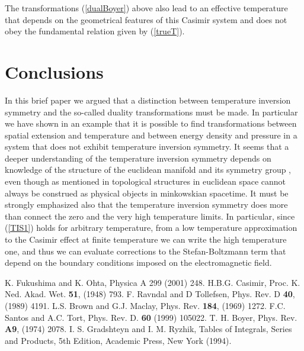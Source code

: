 \documentclass[a4paper,12pt]{article}
\begin{document}
The transformations (\ref{dualBoyer}) above also lead to an effective temperature that depends on the geometrical features of this Casimir system and does not obey the fundamental relation given by (\ref{trueT}).
%
\section{Conclusions}
%
In this brief paper we argued that a distinction between temperature inversion symmetry and the so-called duality transformations must be made. In particular we have shown in an example that it is possible to find transformations between spatial extension and temperature and between energy density and pressure in a system that does not exhibit temperature inversion symmetry. It seems that a deeper understanding of the temperature inversion symmetry depends on knowledge of the structure of the euclidean manifold and its symmetry group \coordHE{}, even though as mentioned in \cite{Fukushima&Ohta2001} topological structures in euclidean space cannot always be construed as physical objects in minkowskian spacetime. It must be strongly emphasized also that the temperature inversion symmetry does more than connect the zero and the very high temperature limits. In particular, since (\ref{TIS1}) holds for arbitrary temperature, from a low temperature approximation to the Casimir effect at finite temperature we can write the high temperature one, and thus we can evaluate corrections to the Stefan-Boltzmann term that depend on the boundary conditions imposed  on the electromagnetic field.

%
\begin{thebibliography}{99}
%
 K. Fukushima and K. Ohta, Physica A 299 (2001) 248.
%
 H.B.G. Casimir, Proc. K. Ned. Akad. Wet. {\bf 51}, (1948) 793.
%
 F. Ravndal and D Tollefsen, Phys. Rev. D {\bf 40}, (1989) 4191.
%
 L.S. Brown and G.J. Maclay, Phys. Rev. \textbf{184}, (1969) 1272.
%
 F.C. Santos and A.C. Tort, Phys. Rev. D. \textbf{60} (1999) 105022.
%
 T. H. Boyer, Phys. Rev. {\bf A9}, (1974) 2078.
%
 I. S. Gradshteyn and I. M. Ryzhik, Tables of Integrals, Series and Products, 5th Edition, Academic Press, New York (1994).
%
%
%
%
%
%
%
%
\end{thebibliography}
\end{document}
